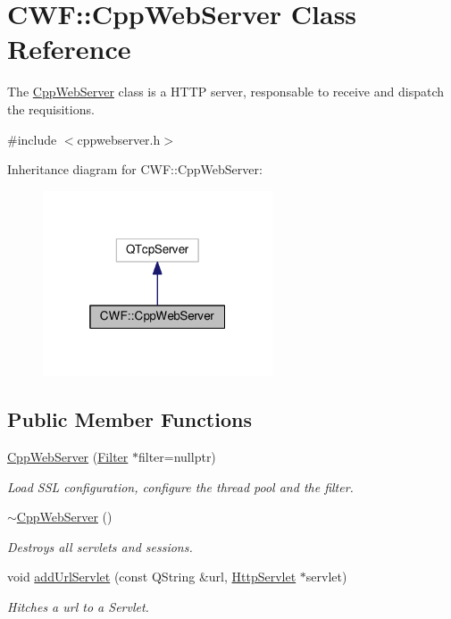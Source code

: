 \hypertarget{class_c_w_f_1_1_cpp_web_server}{\section{C\+W\+F\+:\+:Cpp\+Web\+Server Class Reference}
\label{class_c_w_f_1_1_cpp_web_server}
}


The \hyperlink{class_c_w_f_1_1_cpp_web_server}{Cpp\+Web\+Server} class is a H\+T\+T\+P server, responsable to receive and dispatch the requisitions.  




{\ttfamily \#include $<$cppwebserver.\+h$>$}



Inheritance diagram for C\+W\+F\+:\+:Cpp\+Web\+Server\+:
\nopagebreak
\begin{figure}[H]
\begin{center}
\leavevmode
\includegraphics[width=193pt]{class_c_w_f_1_1_cpp_web_server__inherit__graph}
\end{center}
\end{figure}
\subsection*{Public Member Functions}
\begin{DoxyCompactItemize}
\item 
\hyperlink{class_c_w_f_1_1_cpp_web_server_ae462074ec43b8fc04d3239cde4b7f602}{Cpp\+Web\+Server} (\hyperlink{class_c_w_f_1_1_filter}{Filter} $\ast$filter=nullptr)
\begin{DoxyCompactList}\small\item\em Load S\+S\+L configuration, configure the thread pool and the filter. \end{DoxyCompactList}\item 
\hyperlink{class_c_w_f_1_1_cpp_web_server_ab00bb24440420f41b7328a47def0c0cd}{$\sim$\+Cpp\+Web\+Server} ()
\begin{DoxyCompactList}\small\item\em Destroys all servlets and sessions. \end{DoxyCompactList}\item 
void \hyperlink{class_c_w_f_1_1_cpp_web_server_a8acbe56b5d63ded67879f4ed31170c2e}{add\+Url\+Servlet} (const Q\+String \&url, \hyperlink{class_c_w_f_1_1_http_servlet}{Http\+Servlet} $\ast$servlet)
\begin{DoxyCompactList}\small\item\em Hitches a url to a Servlet. \end{DoxyCompactList}\end{DoxyCompactItemize}


